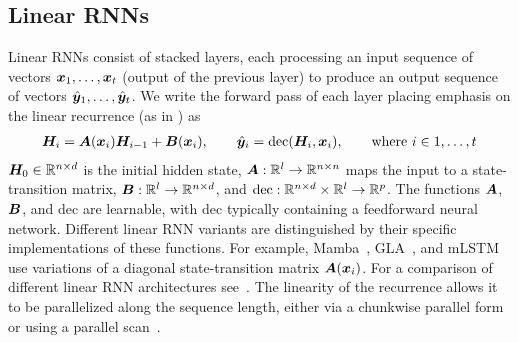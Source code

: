 \documentclass{article} %
\begin{document}
\subsection{Linear RNNs}
Linear RNNs consist of stacked layers, each processing an input sequence of vectors ${\bm{x}}_1, \dots, {\bm{x}}_t$ (output of the previous layer) to produce an output sequence of vectors $\hat{{\bm{y}}}_1,\dots,\hat{{\bm{y}}}_t$. 
We write the forward pass of each layer placing emphasis on the linear recurrence (as in \citet{grazzi-iclr25a}) as
\begin{equation}\label{eq:linrnn}
\begin{aligned}
{\bm{H}}_i = {\bm{A}}({\bm{x}}_i) {\bm{H}}_{i-1} + {\bm{B}}({\bm{x}}_i),\qquad
\hat{{\bm{y}}}_i = \mathrm{dec}({\bm{H}}_i, {\bm{x}}_i),\qquad
\text{where } i \in {1, \dots, t}
\end{aligned}
\end{equation}
${\bm{H}}_0 \in \mathbb{R}^{n \times d}$ is the initial hidden state, ${\bm{A}}: \mathbb{R}^l \to \mathbb{R}^{n \times n}$ maps the input to a state-transition matrix, ${\bm{B}}: \mathbb{R}^l \to \mathbb{R}^{n \times d}$, and $\mathrm{dec}: \mathbb{R}^{n \times d} \times \mathbb{R}^l \to \mathbb{R}^p$. The functions ${\bm{A}}$, ${\bm{B}}$, and $\mathrm{dec}$ are learnable, with $\mathrm{dec}$ typically containing a feedforward neural network. Different linear RNN variants are distinguished by their specific implementations of these functions. For example, Mamba~\citep{gu2023mamba,dao-icml24a}, GLA~\citep{yang-icml24a}, and mLSTM~\citep{beck-neurips24a} use variations of a diagonal state-transition matrix ${\bm{A}}({\bm{x}}_i)$. For a comparison of different linear RNN architectures see~\citet[Table 4]{yang-neurips24a}. The linearity of the recurrence allows it to be parallelized along the sequence length, either via a chunkwise parallel form~\citep{hua-icml22a, sun2023retentive, yang-iclr25a} or using a parallel scan~\citep{Blelloch1990,martin-iclr18a,smith-iclr23a,fan2024advancing,gu2023mamba}.
\end{document}
